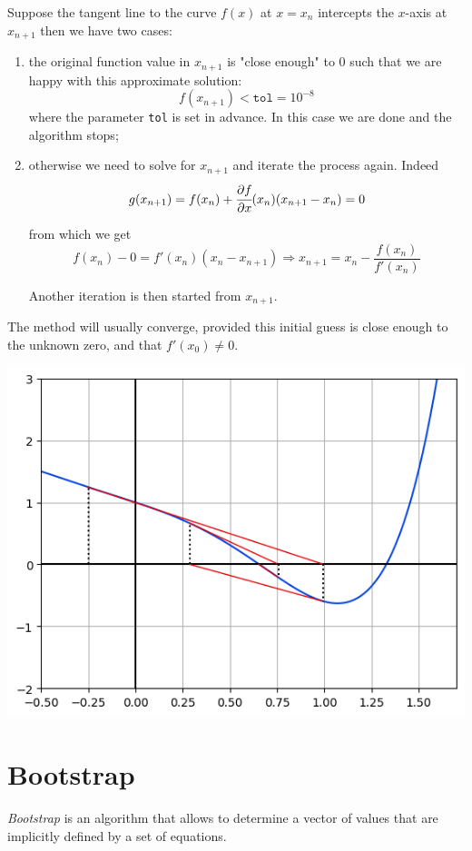 \documentclass[12pt,a4paper]{book}
\begin{document}
Suppose the tangent line to the curve $f(x)$ at $x = x_n$ intercepts the $x$-axis at $x_{n+1}$ then we have two cases:
\begin{enumerate}
\item the original function value in $x_{n+1}$ is "close enough" to 0 such that we are happy with this approximate solution:
\begin{equation*}
f(x_{n+1}) < \texttt{tol}=10^{-8}
\end{equation*}
where the parameter \texttt{tol} is set in advance. In this case we are done and the algorithm stops;
\item otherwise we need to solve for $x_{n+1}$ and iterate the process again. Indeed 
\begin{equation*}
g(x_{n+1}) = f(x_n) + \cfrac{\partial f}{\partial x}(x_n)(x_{n+1} - x_n) = 0
\end{equation*}

from which we get
\begin{equation*}
f(x_{n})-0 = f'(x_n)(x_{n}-x_{n+1}) \Rightarrow x_{n+1}=x_n-\frac {f(x_n)}{f'(x_n)}
\end{equation*}

Another iteration is then started from $x_{n+1}$.
\end{enumerate}

The method will usually converge, provided this initial guess is close enough to the unknown zero, and that $f'(x_0) \neq 0$.
\begin{center}
	\includegraphics[width=0.6\linewidth]{addons/newton_method}
\end{center}

\section{Bootstrap}
\emph{Bootstrap} is an algorithm that allows to determine a vector of values that are implicitly defined by a set of equations.
\end{document}
